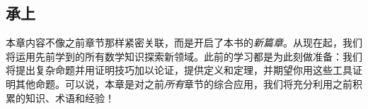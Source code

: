 
\subsection{承上}

本章内容不像之前章节那样紧密关联，而是开启了本书的\emph{新篇章}。从现在起，我们将运用先前学到的所有数学知识探索新领域。此前的学习都是为此刻做准备：我们将提出复杂命题并用证明技巧加以论证，提供定义和定理，并期望你用这些工具证明其他命题。可以说，本章是对之前\emph{所有}章节的综合应用，我们将充分利用之前积累的知识、术语和经验！